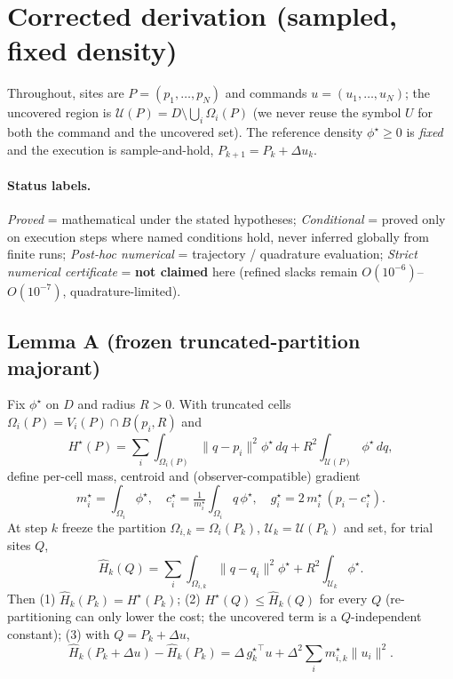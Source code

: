 \section{Corrected derivation (sampled, fixed density)}
\label{sec:derivation}

Throughout, sites are $P=(p_1,\dots,p_N)$ and commands $u=(u_1,\dots,u_N)$; the
uncovered region is $\mathcal{U}(P)=D\setminus\bigcup_i\Omega_i(P)$ (we never
reuse the symbol $U$ for both the command and the uncovered set). The reference
density $\phi^\star\ge0$ is \emph{fixed} and the execution is sample-and-hold,
$P_{k+1}=P_k+\Delta u_k$.

\paragraph{Status labels.}
\emph{Proved} = mathematical under the stated hypotheses;
\emph{Conditional} = proved only on execution steps where named conditions hold,
never inferred globally from finite runs;
\emph{Post-hoc numerical} = trajectory / quadrature evaluation;
\emph{Strict numerical certificate} = \textbf{not claimed} here (refined slacks
remain $O(10^{-6})$--$O(10^{-7})$, quadrature-limited).

\subsection{Lemma A (frozen truncated-partition majorant)}
Fix $\phi^\star$ on $D$ and radius $R>0$. With truncated cells
$\Omega_i(P)=V_i(P)\cap B(p_i,R)$ and
\[
H^\star(P)=\sum_i\int_{\Omega_i(P)}\|q-p_i\|^2\phi^\star\,dq
+R^2\int_{\mathcal{U}(P)}\phi^\star\,dq ,
\]
define per-cell mass, centroid and (observer-compatible) gradient
\[
m_i^\star=\int_{\Omega_i}\phi^\star,\quad
c_i^\star=\tfrac1{m_i^\star}\int_{\Omega_i}q\,\phi^\star,\quad
g_i^\star=2\,m_i^\star\,(p_i-c_i^\star).
\]
At step $k$ freeze the partition $\Omega_{i,k}=\Omega_i(P_k)$,
$\mathcal{U}_k=\mathcal{U}(P_k)$ and set, for trial sites $Q$,
\[
\widehat H_k(Q)=\sum_i\int_{\Omega_{i,k}}\|q-q_i\|^2\phi^\star
+R^2\int_{\mathcal{U}_k}\phi^\star .
\]
Then (1) $\widehat H_k(P_k)=H^\star(P_k)$; (2) $H^\star(Q)\le\widehat H_k(Q)$ for
every $Q$ (re-partitioning can only lower the cost; the uncovered term is a
$Q$-independent constant); (3) with $Q=P_k+\Delta u$,
\[
\widehat H_k(P_k+\Delta u)-\widehat H_k(P_k)
=\Delta\,{g_k^\star}^\top u+\Delta^2\sum_i m_{i,k}^\star\|u_i\|^2 .
\]


